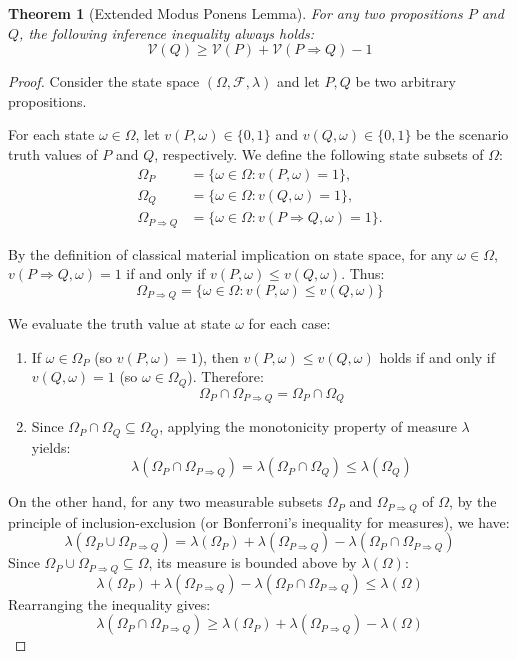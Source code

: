\documentclass[a4paper,12pt, twoside]{memoir}
\newtheorem{theorem}{Theorem}[chapter]
\newcommand{\ddclmd}{\mathcal{V}} %
\begin{document}
\begin{theorem}[Extended Modus Ponens Lemma]
	For any two propositions $P$ and $Q$, the following inference inequality always holds:
	\[
		\ddclmd(Q) \ge \ddclmd(P) + \ddclmd(P \Rightarrow Q) - 1
	\]
\end{theorem}
\begin{proof}
	Consider the state space $(\Omega, \mathcal{F}, \lambda)$ and let $P, Q$ be two arbitrary propositions.

	For each state $\omega \in \Omega$, let $v(P, \omega) \in \{0, 1\}$ and $v(Q, \omega) \in \{0, 1\}$ be the scenario truth values of $P$ and $Q$, respectively. We define the following state subsets of $\Omega$:
	\begin{align*}
		\Omega_P                 & = \{\omega \in \Omega : v(P, \omega) = 1\},               \\
		\Omega_Q                 & = \{\omega \in \Omega : v(Q, \omega) = 1\},               \\
		\Omega_{P \Rightarrow Q} & = \{\omega \in \Omega : v(P \Rightarrow Q, \omega) = 1\}.
	\end{align*}

	By the definition of classical material implication on state space, for any $\omega \in \Omega$, $v(P \Rightarrow Q, \omega) = 1$ if and only if $v(P, \omega) \le v(Q, \omega)$. Thus:
	\[
		\Omega_{P \Rightarrow Q} = \{\omega \in \Omega : v(P, \omega) \le v(Q, \omega)\}
	\]

	We evaluate the truth value at state $\omega$ for each case:
	\begin{enumerate}[leftmargin=*]
		\item If $\omega \in \Omega_P$ (so $v(P, \omega) = 1$), then $v(P, \omega) \le v(Q, \omega)$ holds if and only if $v(Q, \omega) = 1$ (so $\omega \in \Omega_Q$). Therefore:
		      \[
			      \Omega_P \cap \Omega_{P \Rightarrow Q} = \Omega_P \cap \Omega_Q
		      \]
		\item Since $\Omega_P \cap \Omega_Q \subseteq \Omega_Q$, applying the monotonicity property of measure $\lambda$ yields:
		      \[
			      \lambda(\Omega_P \cap \Omega_{P \Rightarrow Q}) = \lambda(\Omega_P \cap \Omega_Q) \le \lambda(\Omega_Q)
		      \]
	\end{enumerate}

	On the other hand, for any two measurable subsets $\Omega_P$ and $\Omega_{P \Rightarrow Q}$ of $\Omega$, by the principle of inclusion-exclusion (or Bonferroni's inequality for measures), we have:
	\[
		\lambda(\Omega_P \cup \Omega_{P \Rightarrow Q}) = \lambda(\Omega_P) + \lambda(\Omega_{P \Rightarrow Q}) - \lambda(\Omega_P \cap \Omega_{P \Rightarrow Q})
	\]
	Since $\Omega_P \cup \Omega_{P \Rightarrow Q} \subseteq \Omega$, its measure is bounded above by $\lambda(\Omega)$:
	\[
		\lambda(\Omega_P) + \lambda(\Omega_{P \Rightarrow Q}) - \lambda(\Omega_P \cap \Omega_{P \Rightarrow Q}) \le \lambda(\Omega)
	\]
	Rearranging the inequality gives:
	\[
		\lambda(\Omega_P \cap \Omega_{P \Rightarrow Q}) \ge \lambda(\Omega_P) + \lambda(\Omega_{P \Rightarrow Q}) - \lambda(\Omega)
	\]


\end{proof}
\end{document}
